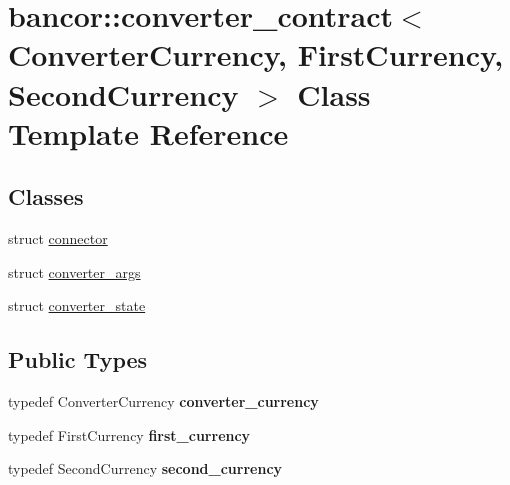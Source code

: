\hypertarget{classbancor_1_1converter__contract}{}\section{bancor\+:\+:converter\+\_\+contract$<$ Converter\+Currency, First\+Currency, Second\+Currency $>$ Class Template Reference}
\label{classbancor_1_1converter__contract}
\subsection*{Classes}
\begin{DoxyCompactItemize}
\item 
struct \mbox{\hyperlink{structbancor_1_1converter__contract_1_1connector}{connector}}
\item 
struct \mbox{\hyperlink{structbancor_1_1converter__contract_1_1converter__args}{converter\+\_\+args}}
\item 
struct \mbox{\hyperlink{structbancor_1_1converter__contract_1_1converter__state}{converter\+\_\+state}}
\end{DoxyCompactItemize}
\subsection*{Public Types}
\begin{DoxyCompactItemize}
\item 
\mbox{\label{classbancor_1_1converter__contract_ae3f4a1a3969a82defd0cdcccea700c69}} 
typedef Converter\+Currency {\bfseries converter\+\_\+currency}
\item 
\mbox{\label{classbancor_1_1converter__contract_a7a46709d66c95ad9c7e4e515e959763f}} 
typedef First\+Currency {\bfseries first\+\_\+currency}
\item 
\mbox{\label{classbancor_1_1converter__contract_aca593e83f7c2c4fb7d84236979cf16fc}} 
typedef Second\+Currency {\bfseries second\+\_\+currency}
\end{DoxyCompactItemize}
